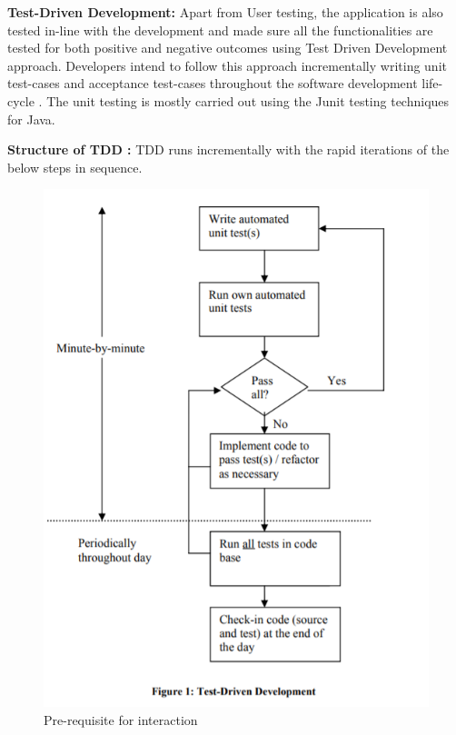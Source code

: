 \textbf{Test-Driven Development:  }\newline
Apart from User testing, the application is also tested in-line with the development and made sure all the functionalities are tested for both positive and negative outcomes using Test Driven Development approach.
Developers intend to follow this approach incrementally writing unit test-cases and acceptance test-cases throughout the software development life-cycle \cite{NachiappanThirumalesh_2006}. 
The unit testing is mostly carried out using the Junit testing techniques for Java.

\textbf{Structure of TDD : } \newline
TDD runs incrementally with the rapid iterations of the below steps in sequence\cite{NachiappanThirumalesh_2006}.

 \begin{figure}[h!]
    \begin{center}
    \includegraphics{images/TDD.PNG} 
  \end{center}
\centering \caption{Pre-requisite for interaction}
\end{figure}


